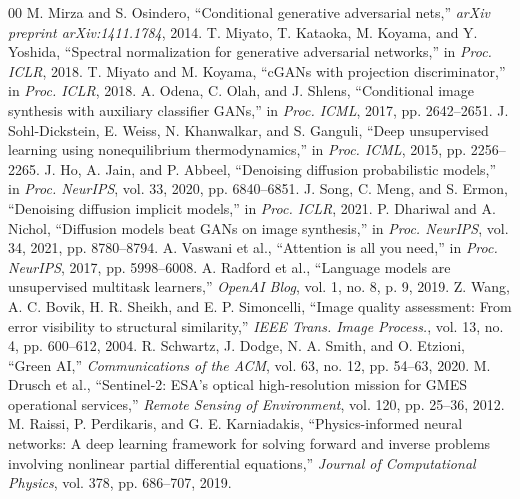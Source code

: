 \documentclass[conference]{IEEEtran}
\begin{document}
\begin{thebibliography}{00}
 M. Mirza and S. Osindero, ``Conditional generative adversarial nets,'' \textit{arXiv preprint arXiv:1411.1784}, 2014.
 T. Miyato, T. Kataoka, M. Koyama, and Y. Yoshida, ``Spectral normalization for generative adversarial networks,'' in \textit{Proc. ICLR}, 2018.
 T. Miyato and M. Koyama, ``cGANs with projection discriminator,'' in \textit{Proc. ICLR}, 2018.
 A. Odena, C. Olah, and J. Shlens, ``Conditional image synthesis with auxiliary classifier GANs,'' in \textit{Proc. ICML}, 2017, pp. 2642--2651.
 J. Sohl-Dickstein, E. Weiss, N. Khanwalkar, and S. Ganguli, ``Deep unsupervised learning using nonequilibrium thermodynamics,'' in \textit{Proc. ICML}, 2015, pp. 2256--2265.
 J. Ho, A. Jain, and P. Abbeel, ``Denoising diffusion probabilistic models,'' in \textit{Proc. NeurIPS}, vol. 33, 2020, pp. 6840--6851.
 J. Song, C. Meng, and S. Ermon, ``Denoising diffusion implicit models,'' in \textit{Proc. ICLR}, 2021.
 P. Dhariwal and A. Nichol, ``Diffusion models beat GANs on image synthesis,'' in \textit{Proc. NeurIPS}, vol. 34, 2021, pp. 8780--8794.
 A. Vaswani et al., ``Attention is all you need,'' in \textit{Proc. NeurIPS}, 2017, pp. 5998--6008.
 A. Radford et al., ``Language models are unsupervised multitask learners,'' \textit{OpenAI Blog}, vol. 1, no. 8, p. 9, 2019.
 Z. Wang, A. C. Bovik, H. R. Sheikh, and E. P. Simoncelli, ``Image quality assessment: From error visibility to structural similarity,'' \textit{IEEE Trans. Image Process.}, vol. 13, no. 4, pp. 600--612, 2004.
 R. Schwartz, J. Dodge, N. A. Smith, and O. Etzioni, ``Green AI,'' \textit{Communications of the ACM}, vol. 63, no. 12, pp. 54--63, 2020.
 M. Drusch et al., ``Sentinel-2: ESA's optical high-resolution mission for GMES operational services,'' \textit{Remote Sensing of Environment}, vol. 120, pp. 25--36, 2012.
 M. Raissi, P. Perdikaris, and G. E. Karniadakis, ``Physics-informed neural networks: A deep learning framework for solving forward and inverse problems involving nonlinear partial differential equations,'' \textit{Journal of Computational Physics}, vol. 378, pp. 686--707, 2019.
\end{thebibliography}
\end{document}
